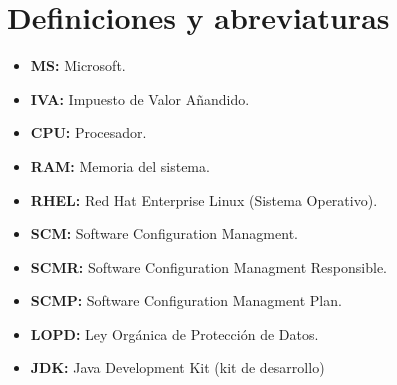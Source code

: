 \section{Definiciones y abreviaturas}
\begin{itemize}
	\item \textbf{MS:} Microsoft.
	\item \textbf{IVA:} Impuesto de Valor Añandido.
	\item \textbf{CPU:} Procesador.
	\item \textbf{RAM:} Memoria del sistema.
	\item \textbf{RHEL:} Red Hat Enterprise Linux (Sistema Operativo).
	\item \textbf{SCM:} Software Configuration Managment.
	\item \textbf{SCMR:} Software Configuration Managment Responsible.
	\item \textbf{SCMP:} Software Configuration Managment Plan.
	\item \textbf{LOPD:} Ley Orgánica de Protección de Datos.
	\item \textbf{JDK:} Java Development Kit (kit de desarrollo)
\end{itemize}